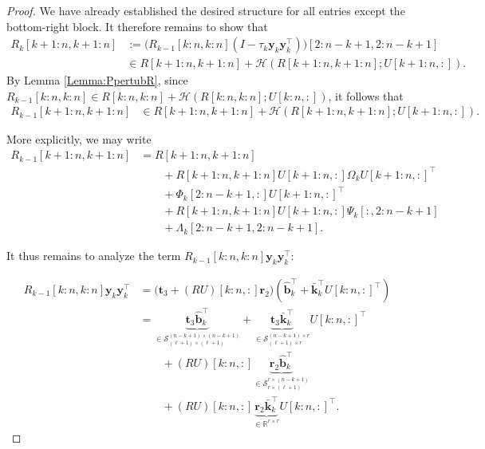 \documentclass[a4paper,fleqn]{cas-sc}
\def\calH{{\mathcal H}}
\def\calS{{\mathcal S}}
\def\bfy{{\mathbf y}}
\def\bfb{{\mathbf b}}
\def\bft{{\mathbf t}}
\def\bfr{{\mathbf r}}
\def\bfk{{\mathbf k}}
\begin{document}
\begin{proof}
    We have already established the desired structure for all entries except the bottom-right block. It therefore remains to show that
    \begin{align*}
        R_k[k\!+\!1\!:\!n,k\!+\!1\!:\!n]& :=\big(R_{k-1}[k\!:\!n,k\!:\!n](I-\tau_k\bfy_k\bfy_k^\top)\big)[2\!:\!n\!-\!k\!+\!1,2\!:\!n\!-\!k\!+\!1]\\
        &\in R[k\!+\!1\!:\!n,k\!+\!1\!:\!n] + \calH(R[k\!+\!1\!:\!n,k\!+\!1\!:\!n];U[k\!+\!1\!:\!n,:]).
    \end{align*}
    By Lemma \ref{Lemma:PpertubR}, since $R_{k-1}[k:n,k:n]\in R[k:n,k:n]+\calH(R[k:n,k:n];U[k:n,:])$, it follows that
    \begin{align*}
        R_{k-1}[k\!+\!1\!:\!n,k\!+\!1\!:\!n] &\in R[k\!+\!1\!:\!n,k\!+\!1\!:\!n]+\calH(R[k\!+\!1\!:\!n,k\!+\!1\!:\!n];U[k\!+\!1\!:\!n,:]).
    \end{align*}

    More explicitly, we may write
    \begin{align*}
        R_{k-1}[k\!+\!1\!:\!n,k\!+\!1\!:\!n]&= R[k\!+\!1\!:\!n,k\!+\!1\!:\!n] \\
        & \qquad +R[k\!+\!1\!:\!n,k\!+\!1\!:\!n]U[k\!+\!1\!:\!n,:]\Omega_k U[k\!+\!1\!:\!n,:]^\top\\
        &\qquad
        +\Phi_k[2\!:\!n\!-\!k\!+\!1,:]U[k\!+\!1\!:\!n,:]^\top\\
        &\qquad +R[k\!+\!1\!:\!n,k\!+\!1\!:\!n]U[k\!+\!1\!:\!n,:]\Psi_k[\!:\!,2\!:\!n\!-\!k\!+\!1]\\
        &\qquad +\Lambda_k[2\!:\!n\!-\!k\!+\!1,2\!:\!n\!-\!k\!+\!1].
    \end{align*}

    It thus remains to analyze the term $R_{k-1}[k:n,k:n]\bfy_k\bfy_k^\top$:

    \begin{align*}
        R_{k-1}[k\!:\!n,k\!:\!n]\bfy_k\bfy_k^\top&=\big(\bft_3+(RU)[k\!:\!n,:]\bfr_2\big)(\hat\bfb_k^\top+\bar\bfk_k^\top U[k\!:\!n,:]^\top)\\
        &=\underbrace{\bft_3\hat\bfb_k^\top}_{\in \calS^{(n-k+1)\times(n-k+1)}_{(\ell+1)\times(\ell+1)}} + \underbrace{\bft_3\bar \bfk_k^\top}_{\in\calS^{(n-k+1)\times r}_{(\ell+1)\times r}} U[k\!:\!n,:]^\top \\
        &\qquad + (RU)[k\!:\!n,:]\underbrace{\bfr_2\hat\bfb_k^\top}_{\in \calS^{r\times(n-k+1)}_{r\times(\ell+1)}} \\
        &\qquad +(RU)[k\!:\!n,:]\underbrace{\bfr_2\bar\bfk_k^\top}_{\in\mathbb R^{r\times r}} U[k\!:\!n,:]^\top.
    \end{align*}


\end{proof}
\end{document}
